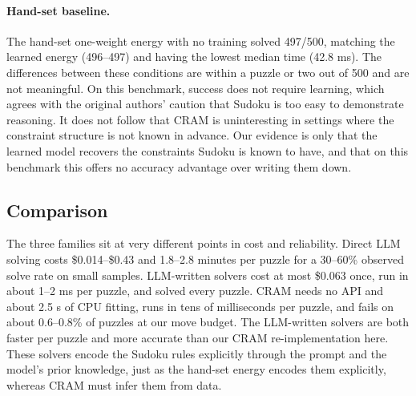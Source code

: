\documentclass{article} %
\begin{document}
\paragraph{Hand-set baseline.}
The hand-set one-weight energy with no training solved 497/500, matching the learned energy (496--497) and having the lowest median time (42.8 ms). The differences between these conditions are within a puzzle or two out of 500 and are not meaningful. On this benchmark, success does not require learning, which agrees with the original authors' caution that Sudoku is too easy to demonstrate reasoning. It does not follow that CRAM is uninteresting in settings where the constraint structure is not known in advance. Our evidence is only that the learned model recovers the constraints Sudoku is known to have, and that on this benchmark this offers no accuracy advantage over writing them down.

\subsection{Comparison}
The three families sit at very different points in cost and reliability. Direct LLM solving costs \$0.014--\$0.43 and 1.8--2.8 minutes per puzzle for a 30--60\% observed solve rate on small samples. LLM-written solvers cost at most \$0.063 once, run in about 1--2 ms per puzzle, and solved every puzzle. CRAM needs no API and about 2.5 s of CPU fitting, runs in tens of milliseconds per puzzle, and fails on about 0.6--0.8\% of puzzles at our move budget. The LLM-written solvers are both faster per puzzle and more accurate than our CRAM re-implementation here. These solvers encode the Sudoku rules explicitly through the prompt and the model's prior knowledge, just as the hand-set energy encodes them explicitly, whereas CRAM must infer them from data.
\end{document}
